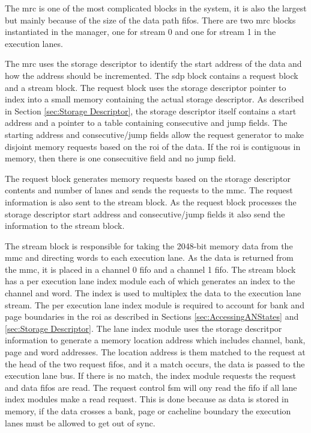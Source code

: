 The \ac{mrc} is one of the most complicated blocks in the system, it is also the largest but mainly because of the size of the data path \acp{fifo}.
There are two \ac{mrc} blocks instantiated in the manager, one for stream 0 and one for stream 1 in the execution lanes.

The \ac{mrc} uses the storage descriptor to identify the start address of the data and how the address should be incremented.
The \ac{sdp} block contains a request block and a stream block.
The request block uses the storage descriptor pointer to index into a small memory containing the actual storage descriptor. 
As described in Section \ref{sec:Storage Descriptor}, the storage descriptor itself contains a start address and a pointer to a table containing consecutive and jump fields.
The starting address and consecutive/jump fields allow the request generator to make disjoint memory requests based on the \ac{roi} of the data. 
If the \ac{roi} is contiguous in memory, then there is one consecuitive field and no jump field.

The request block generates memory requests based on the storage descriptor contents and number of lanes and sends the requests to the \ac{mmc}.
The request information is also sent to the stream block.
As the request block processes the storage descriptor start address and consecutive/jump fields it also send the information to the stream block.

The stream block is responsible for taking the 2048-bit memory data from the \ac{mmc} and directing words to each execution lane.
As the data is returned from the \ac{mmc}, it is placed in a channel 0 \ac{fifo} and a channel 1 \ac{fifo}. 
The stream block has a per execution lane index module each of which generates an index to the channel and word.
The index is used to multiplex the data to the execution lane stream.
The per execution lane index module is required to account for bank and page boundaries in the \ac{roi} as described in Sections \ref{sec:AccessingANStates} and \ref{sec:Storage Descriptor}.
The lane index module uses the storage descritpor information to generate a memory location address which includes channel, bank, page and word addresses.
The location address is them matched to the request at the head of the two request \acp{fifo}, and it a match occurs, the data is passed to the execution lane bus.
If there is no match, the index module requests the request and data \acp{fifo} are read. The request control \ac{fsm} will ony read the \ac{fifo} if all lane index modules make a read request.
This is done because as data is stored in memory, if the data crosses a bank, page or cacheline boundary the execution lanes must be allowed to get out of sync.


